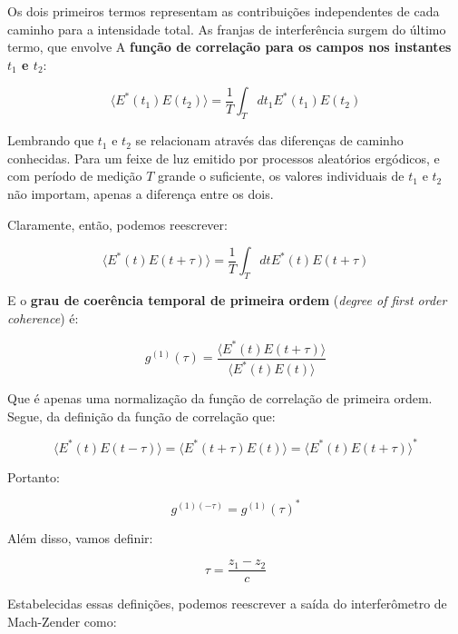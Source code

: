 \documentclass[12pt,a4paper]{report}
\begin{document}

Os dois primeiros termos representam as contribuições independentes de cada caminho para a intensidade total. As franjas de interferência surgem do último termo, que envolve A \textbf{função de correlação para os campos nos instantes $t_1$ e $t_2$}:

\begin{equation}
    \boxed{\langle E^*(t_1)E(t_2)\rangle = \frac{1}{T}\int_{T}dt_1 E^*(t_1)E(t_2)}
\end{equation}

Lembrando que $t_1$ e $t_2$ se relacionam através das diferenças de caminho conhecidas. Para um feixe de luz emitido por processos aleatórios ergódicos, e com período de medição $T$ grande o suficiente, os valores individuais de $t_1$ e $t_2$ não importam, apenas a diferença entre os dois.

Claramente, então, podemos reescrever:

\begin{equation}
    \langle E^*(t)E(t+\tau)\rangle = \frac{1}{T}\int_{T}dt E^*(t)E(t+\tau)
\end{equation}

E o \textbf{grau de coerência temporal de primeira ordem} (\textit{degree of first order coherence}) é:

\begin{equation}
    \boxed{g^{(1)}(\tau)=\frac{\langle E^*(t)E(t+\tau)\rangle}{\langle E^*(t)E(t)\rangle}}
\end{equation}

Que é apenas uma normalização da função de correlação de primeira ordem. Segue, da definição da função de correlação que:

\begin{equation}
    \langle E^*(t)E(t-\tau)\rangle = \langle E^*(t+\tau)E(t)\rangle = \langle E^*(t)E(t+\tau)\rangle^*
\end{equation}

Portanto:

\begin{equation}
    g^{(1)(-\tau)}=g^{(1)}(\tau)^*
\end{equation}

Além disso, vamos definir:

\begin{equation}
    \tau=\frac{z_1-z_2}{c}
\end{equation}

Estabelecidas essas definições, podemos reescrever a saída do interferômetro de Mach-Zender como:
\end{document}
